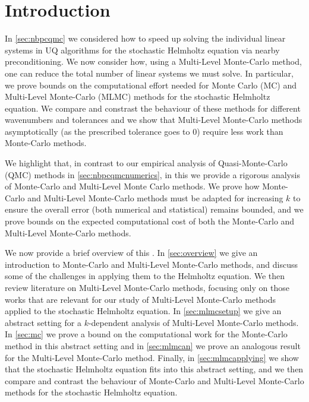\section{Introduction}

In \cref{sec:nbpcqmc} we considered how to speed up solving the individual linear systems in UQ algorithms for the stochastic Helmholtz equation via nearby preconditioning. We now consider how, using a Multi-Level Monte-Carlo method, one can reduce the total number of linear systems we must solve. In particular, we prove bounds on the computational effort needed for Monte Carlo (MC) and Multi-Level Monte-Carlo (MLMC) methods for the stochastic Helmholtz equation. We compare and constrast the behaviour of these methods for different wavenumbers and tolerances and we show that Multi-Level Monte-Carlo methods asymptotically (as the prescribed tolerance goes to 0) require less work than Monte-Carlo methods.

We highlight that, in contrast to our empirical analysis of Quasi-Monte-Carlo (QMC) methods in \cref{sec:nbpcqmcnumerics}, in this  we provide a rigorous analysis of Monte-Carlo and Multi-Level Monte Carlo methods. We prove how Monte-Carlo and Multi-Level Monte-Carlo methods must be adapted for increasing $k$ to ensure the overall error (both numerical and statistical) remains bounded, and we prove bounds on the expected computational cost of both the Monte-Carlo and Multi-Level Monte-Carlo methods.

We now provide a brief overview of this . In \cref{sec:overview} we give an introduction to Monte-Carlo and Multi-Level Monte-Carlo methods, and discuss some of the challenges in applying them to the Helmholtz equation. We then review literature on Multi-Level Monte-Carlo methods, focusing only on those works that are relevant for our study of Multi-Level Monte-Carlo methods applied to the stochastic Helmholtz equation. In \cref{sec:mlmcsetup} we give an abstract setting for a $k$-dependent analysis of Multi-Level Monte-Carlo methods. In \cref{sec:mc} we prove a bound on the computational work for the Monte-Carlo method in this abstract setting and in \cref{sec:mlmcan} we prove an analogous result for the Multi-Level Monte-Carlo method. Finally, in \cref{sec:mlmcapplying} we show that the stochastic Helmholtz equation fits into this abstract setting, and we then compare and contrast the behaviour of Monte-Carlo and Multi-Level Monte-Carlo methods for the stochastic Helmholtz equation.

